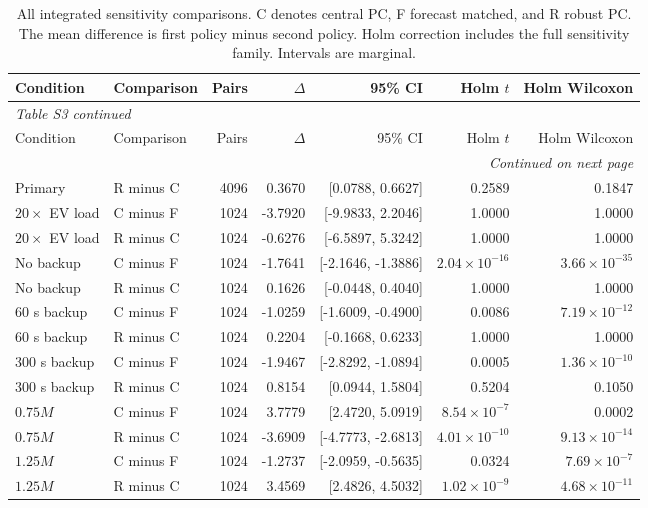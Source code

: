 \clearpage
\footnotesize
\setlength{\tabcolsep}{3pt}
\begin{longtable}{@{}llrrrrr@{}}
\caption{All integrated sensitivity comparisons. C denotes central PC, F forecast matched, and R robust PC. The mean difference is first policy minus second policy. Holm correction includes the full sensitivity family. Intervals are marginal.}\label{tab:supp-sensitivity}\\
\toprule
Condition & Comparison & Pairs & $\Delta$ & 95\% CI & Holm $t$ & Holm Wilcoxon \\
\midrule
\endfirsthead
\multicolumn{7}{l}{\textit{Table S3 continued}}\\
\toprule
Condition & Comparison & Pairs & $\Delta$ & 95\% CI & Holm $t$ & Holm Wilcoxon \\
\midrule\endhead
\midrule\multicolumn{7}{r}{\textit{Continued on next page}}\\\endfoot
\bottomrule\endlastfoot
Primary & R minus C & 4096 & 0.3670 & [0.0788, 0.6627] & 0.2589 & 0.1847 \\
$20\times$ EV load & C minus F & 1024 & -3.7920 & [-9.9833, 2.2046] & 1.0000 & 1.0000 \\
$20\times$ EV load & R minus C & 1024 & -0.6276 & [-6.5897, 5.3242] & 1.0000 & 1.0000 \\
No backup & C minus F & 1024 & -1.7641 & [-2.1646, -1.3886] & $2.04\times10^{-16}$ & $3.66\times10^{-35}$ \\
No backup & R minus C & 1024 & 0.1626 & [-0.0448, 0.4040] & 1.0000 & 1.0000 \\
60 s backup & C minus F & 1024 & -1.0259 & [-1.6009, -0.4900] & 0.0086 & $7.19\times10^{-12}$ \\
60 s backup & R minus C & 1024 & 0.2204 & [-0.1668, 0.6233] & 1.0000 & 1.0000 \\
300 s backup & C minus F & 1024 & -1.9467 & [-2.8292, -1.0894] & 0.0005 & $1.36\times10^{-10}$ \\
300 s backup & R minus C & 1024 & 0.8154 & [0.0944, 1.5804] & 0.5204 & 0.1050 \\
$0.75M$ & C minus F & 1024 & 3.7779 & [2.4720, 5.0919] & $8.54\times10^{-7}$ & 0.0002 \\
$0.75M$ & R minus C & 1024 & -3.6909 & [-4.7773, -2.6813] & $4.01\times10^{-10}$ & $9.13\times10^{-14}$ \\
$1.25M$ & C minus F & 1024 & -1.2737 & [-2.0959, -0.5635] & 0.0324 & $7.69\times10^{-7}$ \\
$1.25M$ & R minus C & 1024 & 3.4569 & [2.4826, 4.5032] & $1.02\times10^{-9}$ & $4.68\times10^{-11}$ \\

\end{longtable}
